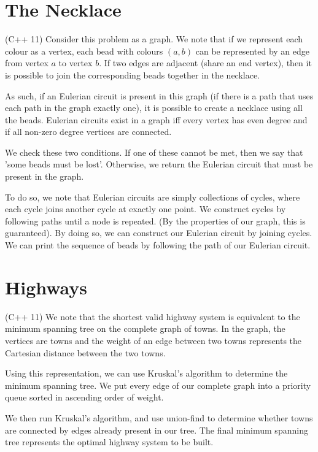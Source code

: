 \documentclass{article}
\begin{document}
\section{The Necklace}
(C++ 11) Consider this problem as a graph. We note that if we represent each colour as a vertex, each bead with colours $(a,b)$ can be represented by an edge from vertex $a$ to vertex $b$. If two edges are adjacent (share an end vertex), then it is possible to join the corresponding beads together in the necklace. 
\par
As such, if an Eulerian circuit is present in this graph (if there is a path that uses each path in the graph exactly one), it is possible to create a necklace using all the beads. Eulerian circuits exist in a graph iff every vertex has even degree and if all non-zero degree vertices are connected. 
\par
We check these two conditions. If one of these cannot be met, then we say that 'some beads must be lost'. Otherwise, we return the Eulerian circuit that must be present in the graph.
\par 
To do so, we note that Eulerian circuits are simply collections of cycles, where each cycle joins another cycle at exactly one point. We construct cycles by following paths until a node is repeated. (By the properties of our graph, this is guaranteed). By doing so, we can construct our Eulerian circuit by joining cycles. We can print the sequence of beads by following the path of our Eulerian circuit.

\section{Highways}
(C++ 11) We note that the shortest valid highway system is equivalent to the minimum spanning tree on the complete graph of towns. In the graph, the vertices are towns and the weight of an edge between two towns represents the Cartesian distance between the two towns.
\par 
Using this representation, we can use Kruskal's algorithm to determine the minimum spanning tree. We put every edge of our complete graph into a priority queue sorted in ascending order of weight.
\par
We then run Kruskal's algorithm, and use union-find to determine whether towns are connected by edges already present in our tree. The final minimum spanning tree represents the optimal highway system to be built.
\end{document}
